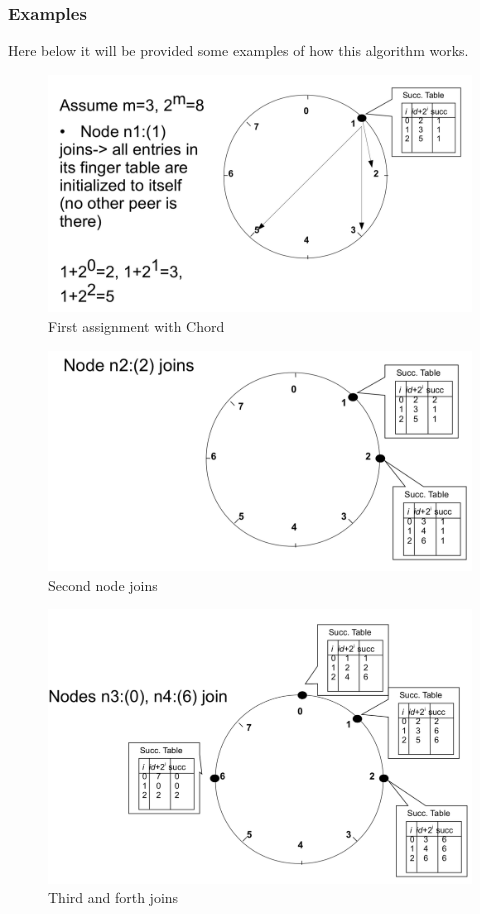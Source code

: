\documentclass[paper=a4, fontsize=11pt]{scrartcl} %
\numberwithin{equation}{section} %
\numberwithin{figure}{section} %
\numberwithin{table}{section} %
\begin{document}
\subsubsection*{Examples}
Here below it will be provided some examples of how this algorithm works. 
 \begin{figure}[H]
  \centering
  \includegraphics[width=1\textwidth]{img/chord1.png}
  \caption{First assignment with Chord}
  
\end{figure} \begin{figure}[H]
  \centering
  \includegraphics[width=1\textwidth]{img/chord2.png}
  \caption{Second node joins}
  
\end{figure} \begin{figure}[H]
  \centering
  \includegraphics[width=1\textwidth]{img/chord3.png}
  \caption{Third and forth joins}
  
\end{figure}
\end{document}
